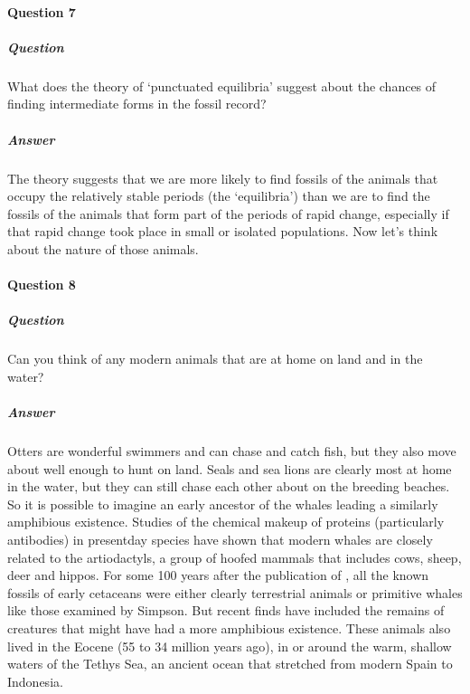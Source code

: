 \documentclass[letterpaper,10pt,english]{sphinxmanual}
\begin{document}
\paragraph{Question 7}
\label{\detokenize{content/session_00/Part_00_04:Question-7}}


\subparagraph{Question}
\label{\detokenize{content/session_00/Part_00_04:id1}}
What does the theory of ‘punctuated equilibria’ suggest about the chances of finding intermediate forms in the fossil record?


\subparagraph{Answer}
\label{\detokenize{content/session_00/Part_00_04:id2}}
The theory suggests that we are more likely to find fossils of the animals that occupy the relatively stable periods (the ‘equilibria’) than we are to find the fossils of the animals that form part of the periods of rapid change, especially if that rapid change took place in small or isolated populations. Now let’s think about the nature of those animals.


\paragraph{Question 8}
\label{\detokenize{content/session_00/Part_00_04:Question-8}}


\subparagraph{Question}
\label{\detokenize{content/session_00/Part_00_04:id3}}
Can you think of any modern animals that are at home on land and in the water?


\subparagraph{Answer}
\label{\detokenize{content/session_00/Part_00_04:id4}}
Otters are wonderful swimmers and can chase and catch fish, but they also move about well enough to hunt on land. Seals and sea lions are clearly most at home in the water, but they can still chase each other about on the breeding beaches. So it is possible to imagine an early ancestor of the whales leading a similarly amphibious existence. Studies of the chemical make\sphinxhyphen{}up of proteins (particularly antibodies) in present\sphinxhyphen{}day species have shown that modern whales are closely related to the
artiodactyls, a group of hoofed mammals that includes cows, sheep, deer and hippos. For some 100 years after the publication of , all the known fossils of early cetaceans were either clearly terrestrial animals or primitive whales like those examined by Simpson. But recent finds have included the remains of creatures that might have had a more amphibious existence. These animals also lived in the Eocene (55 to 34 million years ago), in or around the warm, shallow waters of
the Tethys Sea, an ancient ocean that stretched from modern Spain to Indonesia.
\end{document}
